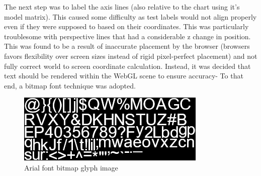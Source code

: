 The next step was to label the axis lines (also relative to the chart using it's model matrix). This caused some difficulty as test labels would not align properly even if they were supposed to based on their coordinates. This was particularly troublesome with perspective lines that had a considerable z change in position. This was found to be a result of inaccurate placement by the browser (browsers favors flexibility over screen sizes instead of rigid pixel-perfect placement) and not fully correct world to screen coordinate calculation. Instead, it was decided that text should be rendered within the WebGL scene to ensure accuracy- To that end, a bitmap font technique was adopted.

\begin{figure}[h]
    \centering
    \includegraphics[width=0.5\columnwidth]{author-files/figures/glyphset.png}
    \caption{Arial font bitmap glyph image}
    \label{fig:arial}
\end{figure}

